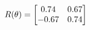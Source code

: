\documentclass[preview]{standalone}
\begin{document}
\begin{align*}
\special{dvisvgm:raw <g id='unique000'>}R(\theta) = \begin{bmatrix}0.74 & 0.67\\-0.67 & 0.74\end{bmatrix}\special{dvisvgm:raw </g>}
\end{align*}
\end{document}

